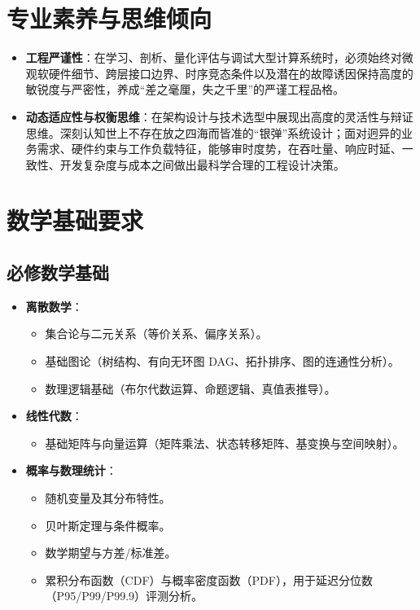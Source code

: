 \section{专业素养与思维倾向}

\begin{itemize}
    \item \textbf{工程严谨性}：在学习、剖析、量化评估与调试大型计算系统时，必须始终对微观软硬件细节、跨层接口边界、时序竞态条件以及潜在的故障诱因保持高度的敏锐度与严密性，养成“差之毫厘，失之千里”的严谨工程品格。
    \item \textbf{动态适应性与权衡思维}：在架构设计与技术选型中展现出高度的灵活性与辩证思维。深刻认知世上不存在放之四海而皆准的“银弹”系统设计；面对迥异的业务需求、硬件约束与工作负载特征，能够审时度势，在吞吐量、响应时延、一致性、开发复杂度与成本之间做出最科学合理的工程设计决策。
\end{itemize}

\section{数学基础要求}

\subsection{必修数学基础}
\begin{itemize}
    \item \textbf{离散数学}：
    \begin{itemize}
        \item 集合论与二元关系（等价关系、偏序关系）。
        \item 基础图论（树结构、有向无环图 DAG、拓扑排序、图的连通性分析）。
        \item 数理逻辑基础（布尔代数运算、命题逻辑、真值表推导）。
    \end{itemize}
    \item \textbf{线性代数}：
    \begin{itemize}
        \item 基础矩阵与向量运算（矩阵乘法、状态转移矩阵、基变换与空间映射）。
    \end{itemize}
    \item \textbf{概率与数理统计}：
    \begin{itemize}
        \item 随机变量及其分布特性。
        \item 贝叶斯定理与条件概率。
        \item 数学期望与方差/标准差。
        \item 累积分布函数（CDF）与概率密度函数（PDF），用于延迟分位数（P95/P99/P99.9）评测分析。
    \end{itemize}
\end{itemize}

